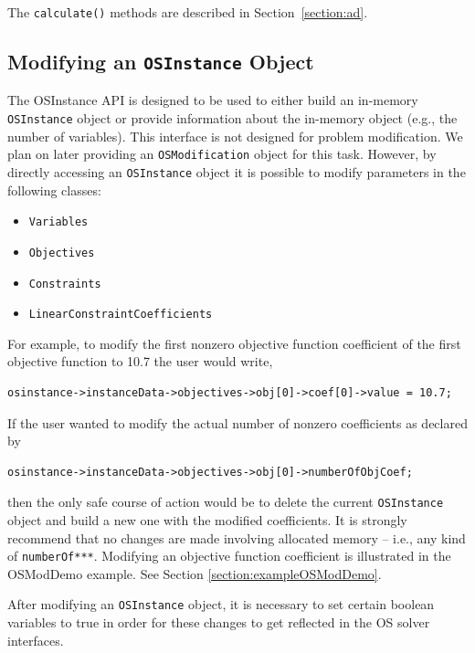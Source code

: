 \documentclass[11pt]{article}
\renewcommand{\_}{{\char"5F}}
\renewcommand{\{}{{\char"7B}}
\renewcommand{\}}{{\char"7D}}
\renewcommand{\^}{{\char"0D}}
\renewcommand{\'}{{\char"0D}}
\begin{document}
\begin{enumerate}[Step 1:]
The {\tt calculate()} methods are described in Section~\ref{section:ad}.


\subsection{Modifying an   {\tt OSInstance} Object}\label{section:osinstanceMod}

The OSInstance API is designed to be used to either build an in-memory {\tt OSInstance} object 
or provide information about the in-memory object (e.g., the number of variables).   
This interface is not designed for problem modification.  We plan on later providing an {\tt OSModification} 
object for this task. However, by directly accessing an {\tt OSInstance} object it is possible 
to modify parameters in the following classes:

\begin{itemize}
\item {\tt Variables}

\item {\tt Objectives}

\item {\tt Constraints}

\item {\tt LinearConstraintCoefficients}
\end{itemize}

For example, to modify the first nonzero objective function coefficient of the first objective  function to 10.7 the user would write,

\begin{verbatim}
osinstance->instanceData->objectives->obj[0]->coef[0]->value = 10.7;
\end{verbatim}
If the user wanted to modify the actual number of nonzero coefficients as declared by 
\begin{verbatim}
osinstance->instanceData->objectives->obj[0]->numberOfObjCoef;
\end{verbatim}
then the only safe course of action would be to delete the current {\tt OSInstance} object 
and build a new one  with the modified coefficients. It is strongly recommend that no changes 
are made involving allocated memory -- i.e., any kind of {\tt numberOf***}.  
Modifying an objective function coefficient is illustrated in the OSModDemo example. 
See Section \ref{section:exampleOSModDemo}.

After modifying an {\tt OSInstance} object, it is necessary to set certain boolean variables 
to true in order for these changes to get reflected in the OS solver interfaces.


\end{enumerate}
\end{document}

